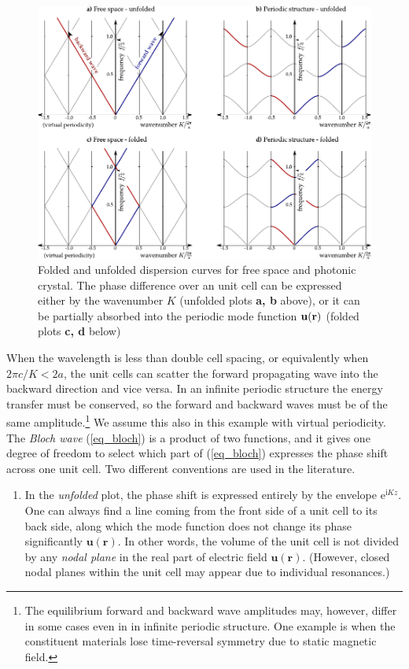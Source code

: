 {\begin{figure}[ht] \caption{Folded and unfolded dispersion curves for free space and photonic crystal. The phase difference over an unit cell can be expressed either by the wavenumber $K$ (unfolded plots \textbf{a, b} above), or it can be partially absorbed into the periodic mode function $\mathbf{u}({\mathbf{r}})$ (folded plots \textbf{c, d} below) } \label{fg_phc} \centering  %
	\includegraphics[width=17cm]{img/PhC_folding_illustration.pdf} 
\end{figure}
When the wavelength is less than double cell spacing, or equivalently when $2\pi c /K < 2 a$, the unit cells can scatter the forward propagating wave into the backward direction and vice versa. In an infinite periodic structure the energy transfer must be conserved, so the forward and backward waves must be of the same amplitude.\footnote{The equilibrium forward and backward wave amplitudes may, however, differ in some cases even in in infinite periodic structure. One example is when the constituent materials lose time-reversal symmetry due to static magnetic field.} We assume this also in this example with virtual periodicity. The \textit{Bloch wave} (\ref{eq_bloch}) is a product of two functions, and it gives one degree of freedom to select which part of (\ref{eq_bloch}) expresses the phase shift across one unit cell. Two different conventions are used in the literature.
\begin{enumerate}
 \item{In the \textit{unfolded} plot, the phase shift is expressed entirely by the envelope $\mathrm{e}^{\mathrm{i}Kz}$. One can always find a line coming from the front side of a unit cell to its back side, along which the mode function does not change its phase significantly $\mathbf{u(\mathbf{r})}$. In other words, the volume of the unit cell is not divided by any \textit{nodal plane} in the real part of electric field  $\mathbf{u(\mathbf{r})}$. (However, closed nodal planes within the unit cell may appear due to individual resonances.)

}
\end{enumerate}}

